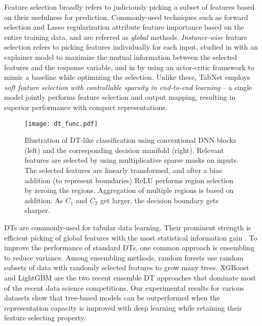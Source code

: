 \noindent{} Feature selection broadly refers to judiciously picking a subset of features based on their usefulness for prediction. 
Commonly-used techniques such as forward selection and Lasso regularization \citep{feature_selection} attribute feature importance based on the entire training data, and are referred as \emph{global} methods. 
\emph{Instance-wise} feature selection refers to picking features individually for each input, studied in \citep{l2x} with an explainer model to maximize the mutual information between the selected features and the response variable, and in \citep{invase} by using an actor-critic framework to mimic a baseline while optimizing the selection. 
Unlike these, TabNet employs \emph{soft feature selection with controllable sparsity in end-to-end learning} -- a single model jointly performs feature selection and output mapping, resulting in superior performance with compact representations.
\begin{figure*}[!htbp]
\centering
\texttt{[image: dt\_func.pdf]}
\caption{
Illustration of DT-like classification using conventional DNN blocks (left) and the corresponding decision manifold (right).
Relevant features are selected by using multiplicative sparse masks on inputs. 
The selected features are linearly transformed, and after a bias addition (to represent boundaries) ReLU performs region selection by zeroing the regions. 
Aggregation of multiple regions is based on addition. 
As $C_1$ and $C_2$ get larger, the decision boundary gets sharper.}
\label{fig:dt_func}
\end{figure*}
\noindent{} DTs are commonly-used for tabular data learning. Their prominent strength is efficient picking of global features with the most statistical information gain \citep{decisiontree1}. 
To improve the performance of standard DTs, one common approach is ensembling to reduce variance. 
Among ensembling methods, random forests \citep{random_forest} use random subsets of data with randomly selected features to grow many trees. XGBoost \citep{XGBoost} and LightGBM \citep{lightgbm} are the two recent ensemble DT approaches that dominate most of the recent data science competitions. 
Our experimental results for various datasets show that tree-based models can be outperformed when the representation capacity is improved with deep learning while retaining their feature selecting property.
\noindent{} 
